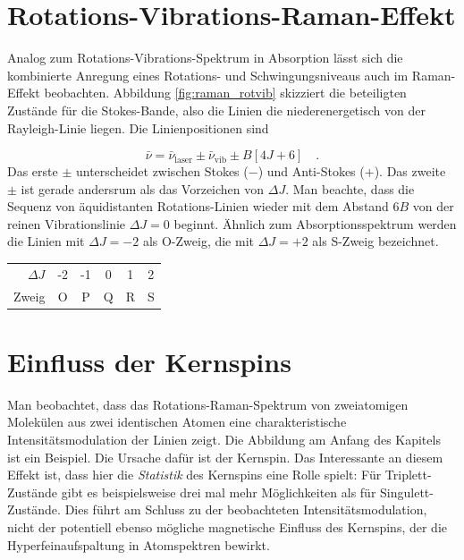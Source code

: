 \begin{marginfigure}
\caption{Rotations-Vibrations-Spektrum in Raman-Streuung. Alle gezeichneten Linien und Übergänge sind Stokes-Übergänge.  \label{fig:raman_rotvib}}
\end{marginfigure}




 \section{Rotations-Vibrations-Raman-Effekt}

Analog zum Rotations-Vibrations-Spektrum in Absorption lässt sich die kombinierte Anregung eines Rotations- und Schwingungsniveaus auch im Raman-Effekt beobachten. Abbildung \ref{fig:raman_rotvib} skizziert die beteiligten Zustände für die Stokes-Bande, also die Linien die niederenergetisch von der Rayleigh-Linie liegen. Die Linienpositionen sind 

\begin{equation}
 \bar{\nu} =  \bar{\nu}_\text{laser} \pm \bar{\nu}_\text{vib} \pm B \left[ 4J + 6 \right]  \quad .
\end{equation}
Das erste $\pm$ unterscheidet zwischen Stokes ($-$) und Anti-Stokes ($+$). Das zweite $\pm$ ist gerade andersrum als das Vorzeichen von $\Delta J$. Man beachte, dass die Sequenz von äquidistanten Rotations-Linien wieder mit dem Abstand $6B$ von der reinen Vibrationslinie  $\Delta J = 0$ beginnt. Ähnlich zum Absorptionsspektrum werden die Linien mit $\Delta J =-2$ als O-Zweig, die mit 
$\Delta J =+2$ als S-Zweig bezeichnet.

\begin{margintable}
\begin{tabular}{rccccc}
$\Delta J$ & -2 & -1 & 0 & 1 & 2 \\
Zweig & O & P & Q & R & S
\end{tabular}
\caption{Nomenklatur der Zweige bei Rotationsspektren. $\Delta J = \pm 1$ im Absorptionsspektrum, $\Delta J = \pm 2$ im Raman-Spektrum sichtbar.}
\end{margintable}



\section{Einfluss der Kernspins}

Man beobachtet, dass das Rotations-Raman-Spektrum von zweiatomigen Molekülen aus zwei identischen Atomen eine charakteristische Intensitätsmodulation der Linien zeigt. Die Abbildung am Anfang des Kapitels ist ein Beispiel. Die Ursache dafür ist der Kernspin. Das Interessante an diesem Effekt ist, dass hier die \emph{Statistik} des Kernspins eine Rolle spielt: Für Triplett-Zustände gibt es beispielsweise drei mal mehr Möglichkeiten als für Singulett-Zustände. Dies führt am Schluss zu der beobachteten Intensitätsmodulation, nicht der potentiell ebenso mögliche magnetische Einfluss des Kernspins, der die Hyperfeinaufspaltung in Atomspektren bewirkt.

